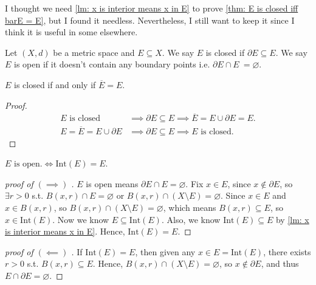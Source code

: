 \begin{note}
    I thought we need \autoref{lm: x is interior means x in E} to prove \autoref{thm: E is closed iff barE = E}, but I found it needless. Nevertheless, I still want to keep it since I think it is useful in some elsewhere.
\end{note}

\begin{definition}
    Let \((X, d)\) be a metric space and \(E \subseteq X\). We say \(E\) is closed if \(\partial E \subseteq E\).  
    We say \(E\) is open if it doesn't contain any boundary points i.e. \(\partial E \cap E\ = \varnothing \).  
\end{definition}

\begin{theorem} \label{thm: E is closed iff barE = E}
    \(E\) is closed if and only if \(\overline{E} = E \).  
\end{theorem}
\begin{proof}
    \begin{align*}
        E \text{ is closed } &\implies  \partial E \subseteq E \implies \overline{E} = E \cup \partial E = E. \\
        E = \overline{E} = E \cup \partial E &\implies \partial E \subseteq E \implies E \text{ is closed}.  
    \end{align*}  
\end{proof}

\begin{theorem}
    \(E \text{ is open.} \iff \mathrm{Int}(E) = E \). 
\end{theorem}
\begin{proof}[proof of \((\implies )\) ]
    \(E\) is open means \(\partial E \cap E = \varnothing \). Fix \(x \in E\), since \(x \notin \partial E\), so \(\exists r > 0\) s.t. \(B(x,r) \cap E = \varnothing \) or \(B(x,r) \cap (X \setminus E) = \varnothing \). Since \(x \in E\) and \(x \in B(x,r)\), so \(B(x,r) \cap (X \setminus E) = \varnothing \), which means \(B(x,r) \subseteq E\), so \(x \in \mathrm{Int} (E)\). Now we know \(E \subseteq \mathrm{Int}(E) \). Also, we know \(\mathrm{Int}(E) \subseteq E \) by \autoref{lm: x is interior means x in E}. Hence, \(\mathrm{Int}(E) = E \).           
\end{proof}
\begin{proof}[proof of \((\impliedby )\) ]
    If \(\mathrm{Int}(E) = E \), then given any \(x \in E = \mathrm{Int}(E) \), there exists \(r>0\) s.t. \(B(x,r) \subseteq E\). Hence, \(B(x,r) \cap (X \setminus E) = \varnothing \), so \(x \notin \partial E\), and thus \(E \cap \partial E = \varnothing \).     
\end{proof}